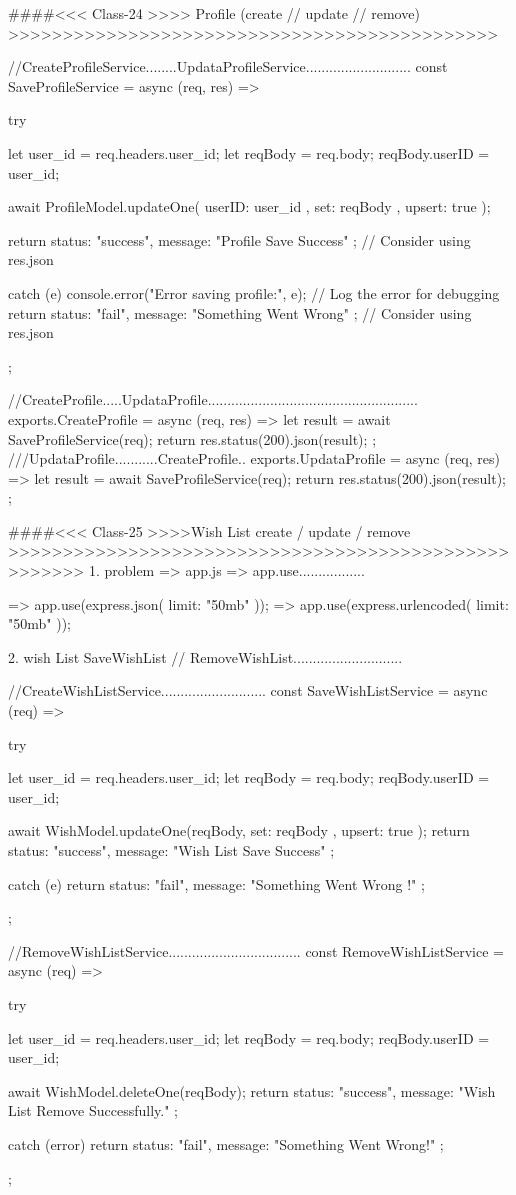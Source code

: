 {{####<<< Class-24 >>>> Profile (create // update // remove) >>>>>>>>>>>>>>>>>>>>>>>>>>>>>>>>>>>>>>>>>>>>>

//CreateProfileService........UpdataProfileService...........................
const SaveProfileService = async (req, res) => {
  try {
    let user_id = req.headers.user_id;
    let reqBody = req.body;
    reqBody.userID = user_id;

    await ProfileModel.updateOne(
      { userID: user_id },
      { set: reqBody },
      { upsert: true }
    );

    return { status: "success", message: "Profile Save Success" }; // Consider using res.json
  } catch (e) {
    console.error("Error saving profile:", e); // Log the error for debugging
    return { status: "fail", message: "Something Went Wrong" }; // Consider using res.json
  }
};

//CreateProfile.....UpdataProfile......................................................
exports.CreateProfile = async (req, res) => {
  let result = await SaveProfileService(req);
  return res.status(200).json(result);
};
///UpdataProfile...........CreateProfile..
exports.UpdataProfile = async (req, res) => {
  let result = await SaveProfileService(req);
  return res.status(200).json(result);
};

####<<< Class-25 >>>>Wish List create / update / remove >>>>>>>>>>>>>>>>>>>>>>>>>>>>>>>>>>>>>>>>>>>>>>>>>>>>>
1. problem => app.js => app.use.................

   => app.use(express.json({ limit: "50mb" }));
   => app.use(express.urlencoded({ limit: "50mb" }));


2. wish List SaveWishList // RemoveWishList............................

//CreateWishListService...........................
const SaveWishListService = async (req) => {
  try {
    let user_id = req.headers.user_id;
    let reqBody = req.body;
    reqBody.userID = user_id;

    await WishModel.updateOne(reqBody, { set: reqBody }, { upsert: true });
    return { status: "success", message: "Wish List Save Success" };
  } catch (e) {
    return { status: "fail", message: "Something Went Wrong !" };
  }
};

//RemoveWishListService..................................
const RemoveWishListService = async (req) => {
  try {
    let user_id = req.headers.user_id;
    let reqBody = req.body;
    reqBody.userID = user_id;

    await WishModel.deleteOne(reqBody);
    return { status: "success", message: "Wish List Remove Successfully." };
  } catch (error) {
    return { status: "fail", message: "Something Went Wrong!" };
  }
};

}}
